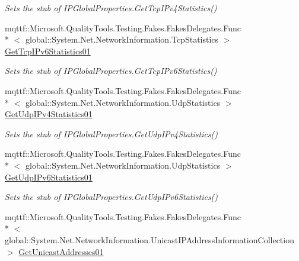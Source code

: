 \begin{DoxyCompactItemize}
\begin{DoxyCompactList}\small\item\em Sets the stub of I\-P\-Global\-Properties.\-Get\-Tcp\-I\-Pv4\-Statistics()\end{DoxyCompactList}\item 
mqttf\-::\-Microsoft.\-Quality\-Tools.\-Testing.\-Fakes.\-Fakes\-Delegates.\-Func\\*
$<$ global\-::\-System.\-Net.\-Network\-Information.\-Tcp\-Statistics $>$ \hyperlink{class_system_1_1_net_1_1_network_information_1_1_fakes_1_1_stub_i_p_global_properties_a9b271ef0385cb214a5fdf1226c7f3f7c}{Get\-Tcp\-I\-Pv6\-Statistics01}
\begin{DoxyCompactList}\small\item\em Sets the stub of I\-P\-Global\-Properties.\-Get\-Tcp\-I\-Pv6\-Statistics()\end{DoxyCompactList}\item 
mqttf\-::\-Microsoft.\-Quality\-Tools.\-Testing.\-Fakes.\-Fakes\-Delegates.\-Func\\*
$<$ global\-::\-System.\-Net.\-Network\-Information.\-Udp\-Statistics $>$ \hyperlink{class_system_1_1_net_1_1_network_information_1_1_fakes_1_1_stub_i_p_global_properties_af03f489ef0b4663c7aedd7bf07d652db}{Get\-Udp\-I\-Pv4\-Statistics01}
\begin{DoxyCompactList}\small\item\em Sets the stub of I\-P\-Global\-Properties.\-Get\-Udp\-I\-Pv4\-Statistics()\end{DoxyCompactList}\item 
mqttf\-::\-Microsoft.\-Quality\-Tools.\-Testing.\-Fakes.\-Fakes\-Delegates.\-Func\\*
$<$ global\-::\-System.\-Net.\-Network\-Information.\-Udp\-Statistics $>$ \hyperlink{class_system_1_1_net_1_1_network_information_1_1_fakes_1_1_stub_i_p_global_properties_aa6881fce3c8f8eff629c3ac4bfe763c4}{Get\-Udp\-I\-Pv6\-Statistics01}
\begin{DoxyCompactList}\small\item\em Sets the stub of I\-P\-Global\-Properties.\-Get\-Udp\-I\-Pv6\-Statistics()\end{DoxyCompactList}\item 
mqttf\-::\-Microsoft.\-Quality\-Tools.\-Testing.\-Fakes.\-Fakes\-Delegates.\-Func\\*
$<$ global\-::\-System.\-Net.\-Network\-Information.\-Unicast\-I\-P\-Address\-Information\-Collection $>$ \hyperlink{class_system_1_1_net_1_1_network_information_1_1_fakes_1_1_stub_i_p_global_properties_a0a10406a0b3743f411925b028167a593}{Get\-Unicast\-Addresses01}

\end{DoxyCompactItemize}
